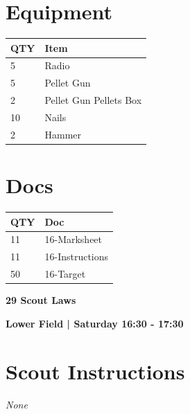 \documentclass[10pt]{article}
\newcommand{\newtitle}[1]{\begin{center}{\Huge\bfseries #1 }\\ \vspace{5mm}\end{center}}
\newcommand{\newsubtitle}[1]{\begin{center}{\color{grey}\Large\bfseries #1 }\\ \vspace{5mm}\end{center}}
\begin{document}
	\begin{multicols}{2}

		\section*{\faWrench \: Equipment}

		
	\begin{center}
			\begin{tabular}{p{2cm}p{4cm}}


				\textbf{QTY} & \textbf{Item} \\\toprule
												5&Radio\\\midrule
												5&Pellet Gun\\\midrule
												2&Pellet Gun Pellets Box\\\midrule
												10&Nails\\\midrule
												2&Hammer\\\midrule
								\end{tabular}

			\end{center}

		
		\vfill\null
		\columnbreak

			\section*{\faFile \: Docs}
		 	\begin{center}
			\begin{tabular}{p{2cm}p{4cm}}

			\textbf{QTY} & \textbf{Doc} \\\toprule
										11&16-Marksheet\\\midrule
										11&16-Instructions\\\midrule
										50&16-Target\\\midrule
							\end{tabular}
			\end{center}
	

		\vfill\null

		\end{multicols}



	\vspace{1cm}


	\clearpage
		\newtitle{29 Scout Laws }
	\newsubtitle{Lower Field | Saturday 16:30 - 17:30}
		\setcounter{section}{28}
	\section*{Scout Instructions}
		\textit{None}
	
\end{document}

